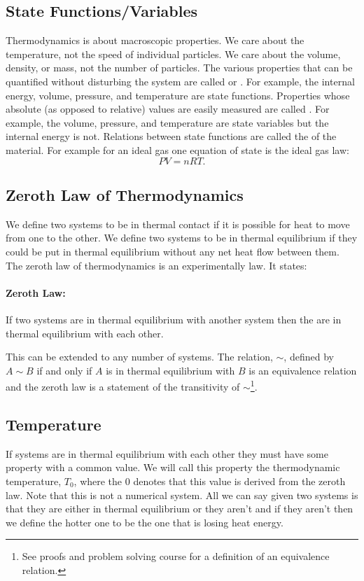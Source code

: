     \subsection{State Functions/Variables}
    Thermodynamics is about macroscopic properties.
    We care about the temperature, not the speed of individual particles.
    We care about the volume, density, or mass, not the number of particles.
    The various properties that can be quantified without disturbing the system are called  or .
    For example, the internal energy, volume, pressure, and temperature are state functions.
    Properties whose absolute (as opposed to relative) values are easily measured are called .
    For example, the volume, pressure, and temperature are state variables but the internal energy is not.
    Relations between state functions are called the  of the material.
    For example for an ideal gas one equation of state is the ideal gas law:
    \[PV = nRT.\]
    
    \subsection{Zeroth Law of Thermodynamics}
    We define two systems to be in thermal contact if it is possible for heat to move from one to the other.
    We define two systems to be in thermal equilibrium if they could be put in thermal equilibrium without any net heat flow between them.
    The zeroth law of thermodynamics is an experimentally law.
    It states:
    \paragraph{Zeroth Law:} If two systems are in thermal equilibrium with another system then the are in thermal equilibrium with each other.
    
    This can be extended to any number of systems.
    The relation, \(\sim\), defined by \(A\sim B\) if and only if \(A\) is in thermal equilibrium with \(B\) is an equivalence relation and the zeroth law is a statement of the transitivity of \(\sim\)\footnote{See proofs and problem solving course for a definition of an equivalence relation.}.
    
    \subsection{Temperature}
    If systems are in thermal equilibrium with each other they must have some property with a common value.
    We will call this property the thermodynamic temperature, \(T_0\), where the 0 denotes that this value is derived from the zeroth law.
    Note that this is not a numerical system.
    All we can say given two systems is that they are either in thermal equilibrium or they aren't and if they aren't then we define the hotter one to be the one that is losing heat energy.
    
